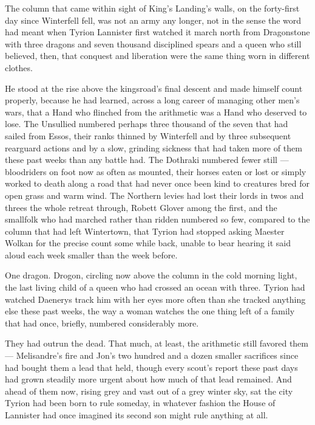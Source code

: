 The column that came within sight of King’s Landing’s walls, on the forty-first day since Winterfell fell, was not an army any longer, not in the sense the word had meant when Tyrion Lannister first watched it march north from Dragonstone with three dragons and seven thousand disciplined spears and a queen who still believed, then, that conquest and liberation were the same thing worn in different clothes.

He stood at the rise above the kingsroad’s final descent and made himself count properly, because he had learned, across a long career of managing other men’s wars, that a Hand who flinched from the arithmetic was a Hand who deserved to lose. The Unsullied numbered perhaps three thousand of the seven that had sailed from Essos, their ranks thinned by Winterfell and by three subsequent rearguard actions and by a slow, grinding sickness that had taken more of them these past weeks than any battle had. The Dothraki numbered fewer still — bloodriders on foot now as often as mounted, their horses eaten or lost or simply worked to death along a road that had never once been kind to creatures bred for open grass and warm wind. The Northern levies had lost their lords in twos and threes the whole retreat through, Robett Glover among the first, and the smallfolk who had marched rather than ridden numbered so few, compared to the column that had left Wintertown, that Tyrion had stopped asking Maester Wolkan for the precise count some while back, unable to bear hearing it said aloud each week smaller than the week before.

One dragon. Drogon, circling now above the column in the cold morning light, the last living child of a queen who had crossed an ocean with three. Tyrion had watched Daenerys track him with her eyes more often than she tracked anything else these past weeks, the way a woman watches the one thing left of a family that had once, briefly, numbered considerably more.

They had outrun the dead. That much, at least, the arithmetic still favored them — Melisandre’s fire and Jon’s two hundred and a dozen smaller sacrifices since had bought them a lead that held, though every scout’s report these past days had grown steadily more urgent about how much of that lead remained. And ahead of them now, rising grey and vast out of a grey winter sky, sat the city Tyrion had been born to rule someday, in whatever fashion the House of Lannister had once imagined its second son might rule anything at all.

